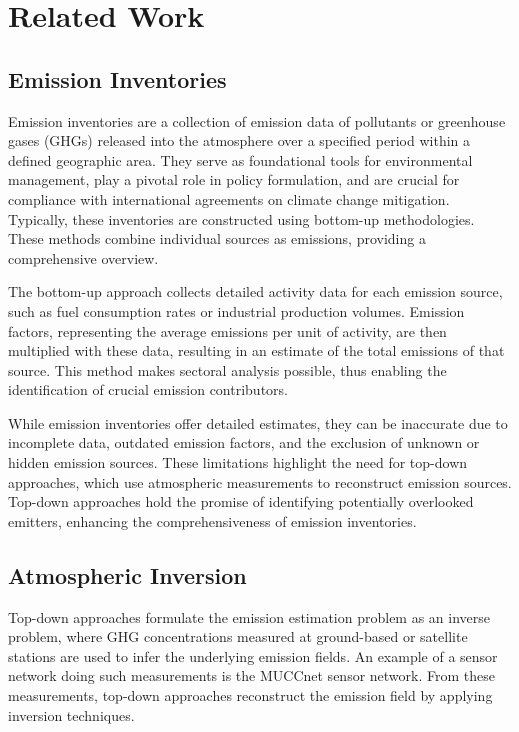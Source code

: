 
\chapter{Related Work}\label{chapter:related_work}

\section{Emission Inventories}
Emission inventories are a collection of emission data of pollutants or greenhouse gases (GHGs) released into the atmosphere over a specified period within a defined geographic area.
They serve as foundational tools for environmental management, play a pivotal role in policy formulation, and are crucial for compliance with international agreements on climate change mitigation.
Typically, these inventories are constructed using bottom-up methodologies.
These methods combine individual sources as emissions, providing a comprehensive overview.

The bottom-up approach collects detailed activity data for each emission source, such as fuel consumption rates or industrial production volumes.
Emission factors, representing the average emissions per unit of activity, are then multiplied with these data, resulting in an estimate of the total emissions of that source.
This method makes sectoral analysis possible, thus enabling the identification of crucial emission contributors.

While emission inventories offer detailed estimates, they can be inaccurate due to incomplete data, outdated emission factors, and the exclusion of unknown or hidden emission sources.
These limitations highlight the need for top-down approaches, which use atmospheric measurements to reconstruct emission sources.
Top-down approaches hold the promise of identifying potentially overlooked emitters, enhancing the comprehensiveness of emission inventories.

\section{Atmospheric Inversion}
Top-down approaches formulate the emission estimation problem as an inverse problem, where GHG concentrations measured at ground-based or satellite stations are used to infer the underlying emission fields.
An example of a sensor network doing such measurements is the MUCCnet sensor network.
From these measurements, top-down approaches reconstruct the emission field by applying inversion techniques. 

